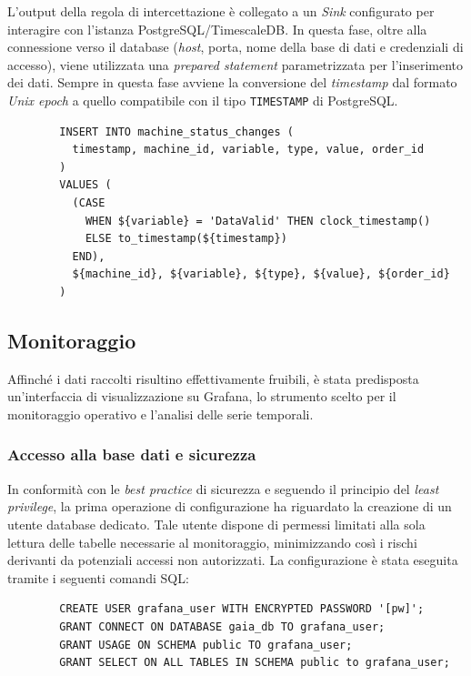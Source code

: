 \documentclass[12pt]{article}
\begin{document}
    L'output della regola di intercettazione è collegato a un \textit{Sink} configurato per interagire con l'istanza PostgreSQL/TimescaleDB.  In questa fase, oltre alla connessione verso il database (\textit{host}, porta, nome della base di dati e credenziali di accesso), viene utilizzata una \textit{prepared statement} parametrizzata per l'inserimento dei dati. Sempre in questa fase avviene la conversione del \textit{timestamp} dal formato \textit{Unix epoch} a quello compatibile con il tipo \verb|TIMESTAMP| di PostgreSQL.
    
    \begin{verbatim}
        INSERT INTO machine_status_changes (
          timestamp, machine_id, variable, type, value, order_id
        ) 
        VALUES (
          (CASE 
            WHEN ${variable} = 'DataValid' THEN clock_timestamp()
            ELSE to_timestamp(${timestamp})
          END),
          ${machine_id}, ${variable}, ${type}, ${value}, ${order_id}
        )
    \end{verbatim}

    \subsection{Monitoraggio}

    Affinché i dati raccolti risultino effettivamente fruibili, è stata predisposta un'interfaccia di visualizzazione su Grafana, lo strumento scelto per il monitoraggio operativo e l'analisi delle serie temporali.
    
    \subsubsection{Accesso alla base dati e sicurezza}
    
    In conformità con le \textit{best practice} di sicurezza e seguendo il principio del \textit{least privilege}, la prima operazione di configurazione ha riguardato la creazione di un utente database dedicato. Tale utente dispone di permessi limitati alla sola lettura delle tabelle necessarie al monitoraggio, minimizzando così i rischi derivanti da potenziali accessi non autorizzati. La configurazione è stata eseguita tramite i seguenti comandi SQL:
    
    \begin{verbatim}
        CREATE USER grafana_user WITH ENCRYPTED PASSWORD '[pw]';
        GRANT CONNECT ON DATABASE gaia_db TO grafana_user;
        GRANT USAGE ON SCHEMA public TO grafana_user;
        GRANT SELECT ON ALL TABLES IN SCHEMA public to grafana_user;
    \end{verbatim}
    
\end{document}
